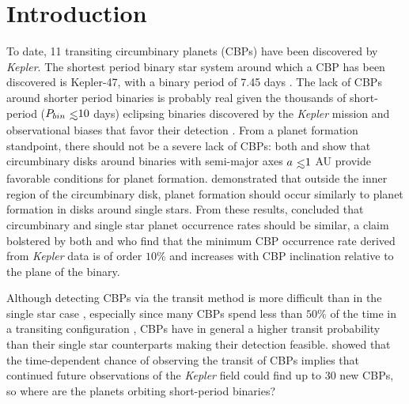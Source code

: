 

\section{Introduction} \label{sec:intro}

To date, 11 transiting circumbinary planets (CBPs) have been discovered by {\it Kepler}.  The shortest period binary star system around which a CBP has been discovered is Kepler-47, with a binary period of 7.45 days \citep{Orosz2012}.  The lack of CBPs around shorter period binaries is probably real given the thousands of short-period ($P_{bin} \lsim 10$ days) eclipsing binaries discovered by the {\it Kepler} mission \citep{Kirk2016} and observational biases that favor their detection \citep{Munoz2015}.  From a planet formation standpoint, there should not be a severe lack of CBPs: both \citet{Alexander2012} and \citet{Vartanyan2016} show that circumbinary disks around binaries with semi-major axes $a \lsim 1$ AU provide favorable conditions for planet formation. \citet{Bromley2015} demonstrated that outside the inner region of the circumbinary disk, planet formation should occur similarly to planet formation in disks around single stars.  From these results, \citet{Bromley2015} concluded that circumbinary and single star planet occurrence rates should be similar, a claim bolstered by both \citet{Martin2014} and \citet{Armstrong2014} who find that the minimum CBP occurrence rate derived from {\it Kepler} data is of order $10\%$ and increases with CBP inclination relative to the plane of the binary.  

Although detecting CBPs via the transit method is more difficult than in the single star case \citep{Welsh2014,Winn2015}, especially since many CBPs spend less than $50 \%$ of the time in a transiting configuration \citep{Martin2017}, CBPs have in general a higher transit probability than their single star counterparts \citep{Martin2015a} making their detection feasible.  \citet{Martin2017} showed that the time-dependent chance of observing the transit of CBPs implies that continued future observations of the {\it Kepler} field could find up to 30 new CBPs, so where are the planets orbiting short-period binaries?

